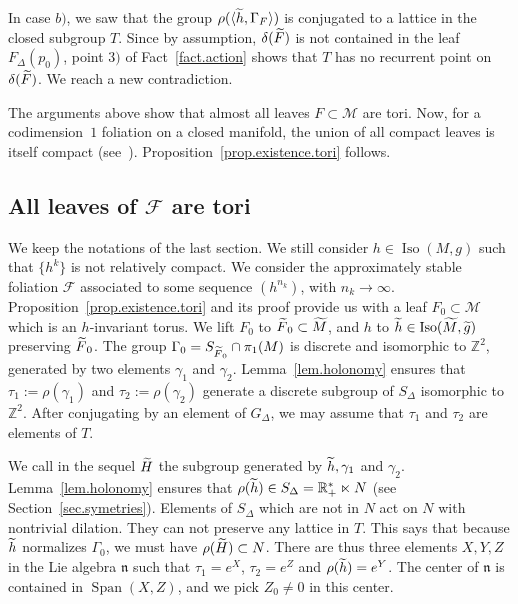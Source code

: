 \documentclass[11pt]{article}
\theoremstyle{definition}
\numberwithin{equation}{section}
\numberwithin{figure}{section}
\numberwithin{table}{section}
\DeclareMathOperator{\Iso}{Iso}
\DeclareMathOperator{\Span}{Span}
\newcommand{\calf}{\mathcal{F}}
\newcommand{\calm}{\mathcal{M}}
\newcommand{\tm}{\tilde{{M}}}
\newcommand{\tF}{\tilde{{F}}}
\newcommand{\tth}{\tilde{h}}
\newcommand*\RR{\mathbb{R}}
\newcommand*\ZZ{\mathbb{Z}}
\newcommand{\lien}{{\mathfrak{n}}}
\let\oldtilde\tilde
\renewcommand*\tilde[1]{\mathchoice{\widetilde{#1}}{\widetilde{#1}}{\widetilde{#1}}{\oldtilde{#1}}}
\begin{document}
In case $b)$, we saw that the group $\rho(\langle \tth,\Gamma_{F}\rangle )$ is conjugated to a lattice in the closed subgroup $T$. Since by assumption, $\delta(\tF)$ is not contained in the leaf $F_{\Delta}(p_0)$, point $3)$ of Fact~\ref{fact.action} shows that $T$ has no recurrent point on $\delta(\tF)$. We reach a new contradiction.


The arguments above show that almost all leaves $F \subset \calm$ are tori. Now, for a codimension~$1$ foliation on a closed manifold, the union of all compact leaves is itself compact (see~\cite[Chapter~II, Corollary~3.10]{godbillon}). Proposition~\ref{prop.existence.tori} follows.


\subsection{All leaves of \texorpdfstring{${\mathcal F}$}{F} are tori}

We keep the notations of the last section. We still consider $h \in \Iso(M,g)$ such that $\{ h^k \}$ is not relatively compact. We consider the approximately stable foliation $\calf$ associated to some sequence $(h^{n_k})$, with $n_k \to \infty$. Proposition~\ref{prop.existence.tori} and its proof provide us with a leaf $F_0 \subset \calm$ which is an $h$-invariant torus. We lift $F_0$ to $\tF_0 \subset \tm$, and $h$ to $\tth \in \Iso(\tm,\tilde{g})$ preserving $\tF_0$. The group $\Gamma_0=S_{\tF_0} \cap \pi_1(M)$ is discrete and isomorphic to $\ZZ^2$, generated by two elements $\gamma_1$ and $\gamma_2$. Lemma~\ref{lem.holonomy} ensures that $\tau_1:=\rho(\gamma_1)$ and $\tau_2:=\rho(\gamma_2)$ generate a discrete subgroup of $S_{\Delta}$ isomorphic to $\ZZ^2$. After conjugating by an element of $G_{\Delta}$, we may assume that $\tau_1$ and $\tau_2$ are elements of $T$.

We call in the sequel $\tilde{H}$ the subgroup generated by $\tth, \gamma_1$ and $\gamma_2$. Lemma~\ref{lem.holonomy} ensures that $\rho(\tth) \in S_{\Delta}=\RR_+^* \ltimes N$ (see Section~\ref{sec.symetries}). Elements of $S_{\Delta}$ which are not in $N$ act on $N$ with nontrivial dilation. They can not preserve any lattice in $T$. This says that because $\tth$ normalizes $\Gamma_0$, we must have $\rho(\tilde{H}) \subset N$. There are thus three elements $X,Y,Z$ in the Lie algebra $\lien$ such that $\tau_1=e^X$, $\tau_2=e^Z$ and $\rho(\tth)=e^Y$. The center of $\lien$ is contained in $\Span(X,Z)$, and we pick $Z_0 \not =0$ in this center.
\end{document}
